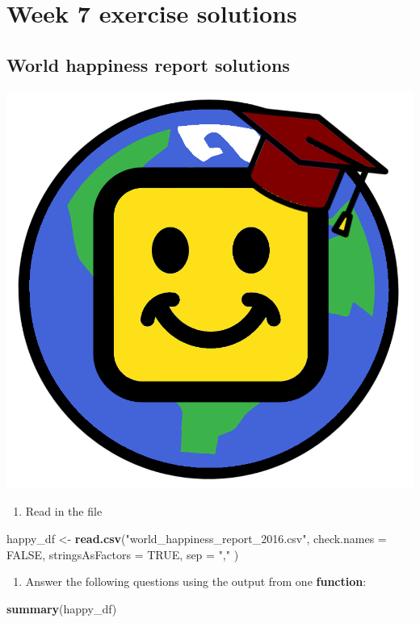 \documentclass[]{book}
\newenvironment{Shaded}{\begin{snugshade}}{\end{snugshade}}
\newcommand{\KeywordTok}[1]{\textcolor[rgb]{0.13,0.29,0.53}{\textbf{#1}}}
\newcommand{\DataTypeTok}[1]{\textcolor[rgb]{0.13,0.29,0.53}{#1}}
\newcommand{\StringTok}[1]{\textcolor[rgb]{0.31,0.60,0.02}{#1}}
\newcommand{\OtherTok}[1]{\textcolor[rgb]{0.56,0.35,0.01}{#1}}
\newcommand{\NormalTok}[1]{#1}
\providecommand{\tightlist}{%
  \setlength{\itemsep}{0pt}\setlength{\parskip}{0pt}}
\begin{document}
\chapter{Week 7 exercise solutions}\label{week-7-exercise-solutions}

\section{World happiness report
solutions}\label{world-happiness-report-solutions}

\begin{center}\includegraphics[width=0.2\linewidth]{figures/world_happiness_solutions} \end{center}

\begin{enumerate}
\def\labelenumi{\arabic{enumi}.}
\tightlist
\item
  Read in the file
\end{enumerate}

\begin{Shaded}
\begin{Highlighting}[]
\NormalTok{happy_df <-}\StringTok{ }\KeywordTok{read.csv}\NormalTok{(}\StringTok{"world_happiness_report_2016.csv"}\NormalTok{, }
                      \DataTypeTok{check.names =} \OtherTok{FALSE}\NormalTok{,}
                      \DataTypeTok{stringsAsFactors =} \OtherTok{TRUE}\NormalTok{,}
                      \DataTypeTok{sep =} \StringTok{","}
\NormalTok{                      )}
\end{Highlighting}
\end{Shaded}

\begin{enumerate}
\def\labelenumi{\arabic{enumi}.}
\setcounter{enumi}{1}
\tightlist
\item
  Answer the following questions using the output from one
  \textbf{function}:
\end{enumerate}

\begin{Shaded}
\begin{Highlighting}[]
\KeywordTok{summary}\NormalTok{(happy_df)}
\end{Highlighting}
\end{Shaded}
\end{document}
